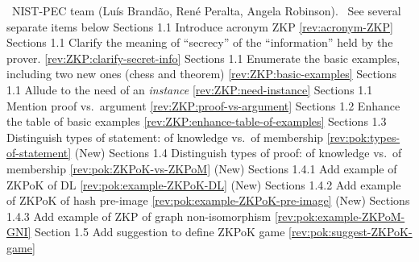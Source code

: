 \newcol {}
\newcol \contributors\ NIST-PEC team (Luís Brandão, René Peralta, Angela Robinson).
				\Note\ See several separate items below
\newcol 
\rowendL
Sections 1.1
\newcol \newcol \newcol Introduce acronym ZKP
\newcol \ref{rev:acronym-ZKP}
\rowendL
Sections 1.1
\newcol \newcol \newcol Clarify the meaning of ``secrecy'' of the ``information'' held by the prover.
\newcol \ref{rev:ZKP:clarify-secret-info}
\rowendL
Sections 1.1
\newcol \newcol \newcol Enumerate the basic examples, including two new ones (chess and theorem)
\newcol \ref{rev:ZKP:basic-examples}
\rowendL
Sections 1.1
\newcol \newcol \newcol Allude to the need of an \emph{instance}
\newcol \ref{rev:ZKP:need-instance}
\rowendL
Sections 1.1
\newcol \newcol \newcol Mention proof vs.\ argument
\newcol \ref{rev:ZKP:proof-vs-argument}
\rowendL
Sections 1.2
\newcol \newcol \newcol Enhance the table of basic examples
\newcol \ref{rev:ZKP:enhance-table-of-examples}
\rowendL
Sections 1.3
\newcol \newcol \newcol Distinguish types of statement: of knowledge vs.\ of membership
\newcol \ref{rev:pok:types-of-statement}
\rowendL
(New) Sections 1.4
\newcol \newcol \newcol Distinguish types of proof: of knowledge vs.\ of membership
\newcol \ref{rev:pok:ZKPoK-vs-ZKPoM}
\rowendL
(New) Sections 1.4.1
\newcol \newcol \newcol Add example of ZKPoK of DL
\newcol \ref{rev:pok:example-ZKPoK-DL}
\rowendL
(New) Sections 1.4.2
\newcol \newcol \newcol Add example of ZKPoK of hash pre-image
\newcol \ref{rev:pok:example-ZKPoK-pre-image}
\rowendL
(New) Sections 1.4.3
\newcol \newcol \newcol Add example of ZKP of graph non-isomorphism
\newcol \ref{rev:pok:example-ZKPoM-GNI}
\rowendL
Section 1.5
\newcol \newcol \newcol Add suggestion to define ZKPoK game
\newcol \ref{rev:pok:suggest-ZKPoK-game}
\rowendL
\myendIssue



